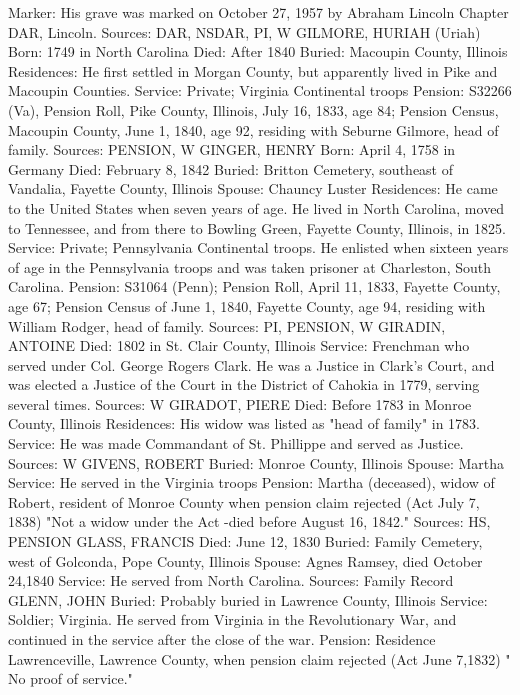 Marker: His grave was marked on October 27, 1957 by Abraham Lincoln Chapter DAR, Lincoln. 
Sources: DAR, NSDAR, PI, W 
GILMORE, HURIAH (Uriah) 
Born: 1749 in North Carolina Died: After 1840 Buried: Macoupin County, Illinois 
Residences: He first settled in Morgan County, but apparently lived in Pike and Macoupin Counties. 
Service: Private; Virginia Continental troops 
Pension: S32266 (Va), Pension Roll, Pike County, Illinois, July 16, 1833, age 84; Pension Census, Macoupin County, June 1, 1840, age 92, residing with Seburne Gilmore, head of family. 
Sources: PENSION, W 
GINGER, HENRY 
Born: April 4, 1758 in Germany 
Died: February 8, 1842 
Buried: Britton Cemetery, southeast of Vandalia, Fayette County, Illinois 
Spouse: Chauncy Luster 
Residences: He came to the United States when seven years of age. He lived in North Carolina, moved to Tennessee, and from there to Bowling Green, Fayette County, Illinois, in 1825. 
Service: Private; Pennsylvania Continental troops. He enlisted when sixteen years of age in the Pennsylvania troops and was taken prisoner at Charles­ton, South Carolina. 
Pension: S31064 (Penn); Pension Roll, April 11, 1833, Fayette County, age 67; Pension Census of June 1, 1840, Fayette County, age 94, residing with Wil­liam Rodger, head of family. 
Sources: PI, PENSION, W 
GIRADIN, ANTOINE 
Died: 1802 in St. Clair County, Illinois 
Service: Frenchman who served under Col. George Rogers Clark. He was a Justice in Clark's Court, and was elected a Justice of the Court in the Dis­trict of Cahokia in 1779, serving several times. 
Sources: W 
GIRADOT, PIERE 
Died: Before 1783 in Monroe County, Illinois 
Residences: His widow was listed as "head of family" in 1783. 
Service: He was made Commandant of St. Phillippe and served as Justice. 
Sources: W 
GIVENS, ROBERT 
Buried: Monroe County, Illinois Spouse: Martha 
Service: He served in the Virginia troops 
Pension: Martha (deceased), widow of Robert, resident of Monroe County when pension claim rejected (Act July 7, 1838) "Not a widow under the Act -died before August 16, 1842." 
Sources: HS, PENSION 
GLASS, FRANCIS 
Died: June 12, 1830 
Buried: Family Cemetery, west of Golconda, Pope County, Illinois 
Spouse: Agnes Ramsey, died October 24,1840 
Service: He served from North Carolina. 
Sources: Family Record 
GLENN, JOHN 
Buried: Probably buried in Lawrence County, Illinois 
Service: Soldier; Virginia. He served from Virginia in the Revolutionary War, and continued in the service after the close of the war. 
Pension: Residence Lawrenceville, Lawrence County, when pension claim rejected (Act June 7,1832) " No proof of service." 
